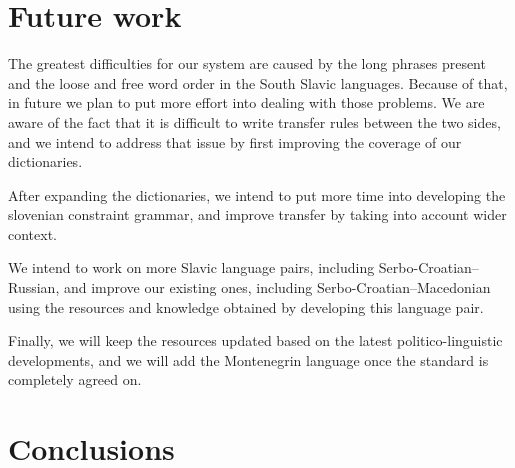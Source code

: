 \section{Future work}

The greatest difficulties for our system are caused by the long phrases present 
and the loose and free word order in the South Slavic languages.
Because of that, in future we plan to put more effort into dealing with those problems.
We are aware of the fact that it is difficult to write transfer rules between the two sides,
and we intend to address that issue by first improving the coverage of our dictionaries.

After expanding the dictionaries, we intend to put more time into developing the slovenian constraint grammar,
and improve transfer by taking into account wider context.

We intend to work on more Slavic language pairs, including Serbo-Croatian--Russian,
and improve our existing ones, including Serbo-Croatian--Macedonian \citep{peradin12} using the 
resources and knowledge obtained by developing this language pair.

Finally, we will keep the resources updated based on the latest politico-linguistic developments,
and we will add the Montenegrin language once the standard is completely agreed on.



\section{Conclusions}
